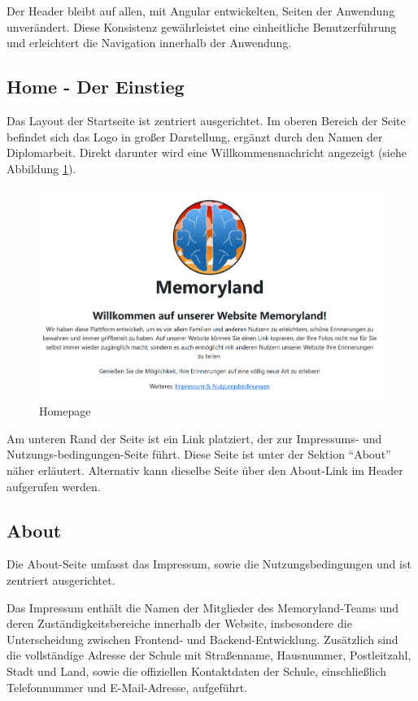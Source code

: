 Der Header bleibt auf allen, mit Angular entwickelten, Seiten der Anwendung unverändert. Diese Konsistenz gewährleistet eine einheitliche Benutzerführung und erleichtert die Navigation innerhalb der Anwendung.


\subsection{Home - Der Einstieg}

Das Layout der Startseite ist zentriert ausgerichtet. Im oberen Bereich der Seite befindet sich das Logo in gro\ss{}er Darstellung, ergänzt durch den Namen der Diplomarbeit. Direkt darunter wird eine Willkommensnachricht angezeigt (siehe Abbildung \ref{fig:homepage}).

\begin{figure} [h t]
    \centering
    \includegraphics[scale=0.4]{pics/home_page.PNG}
    \caption{Homepage}
    \label{fig:homepage}
\end{figure}


Am unteren Rand der Seite ist ein Link platziert, der zur Impressums- und Nutzungs-bedingungen-Seite führt. Diese Seite ist unter der Sektion ``About'' näher erläutert. Alternativ kann dieselbe Seite über den About-Link im Header aufgerufen werden.

\subsection{About}

Die About-Seite umfasst das Impressum, sowie die Nutzungsbedingungen und ist zentriert ausgerichtet.


Das Impressum enthält die Namen der Mitglieder des Memoryland-Teams und deren Zuständigkeitsbereiche innerhalb der Website, insbesondere die Unterscheidung zwischen Frontend- und Backend-Entwicklung. Zusätzlich sind die vollständige Adresse der Schule mit Stra\ss{}enname, Hausnummer, Postleitzahl, Stadt und Land, sowie die offiziellen Kontaktdaten der Schule, einschlie\ss{}lich Telefonnummer und E-Mail-Adresse, aufgeführt.

